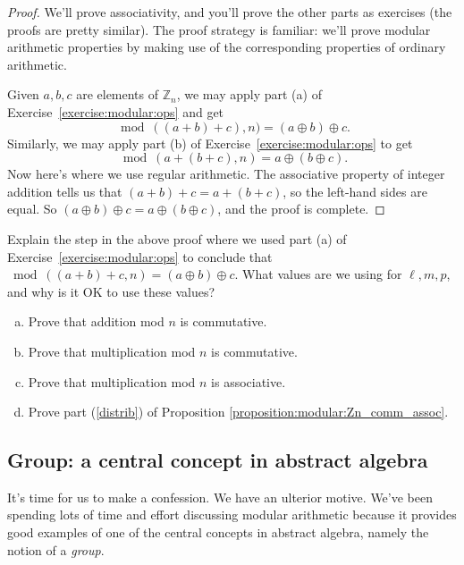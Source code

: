 \begin{proof}
We'll prove associativity, and  you'll prove the other parts as exercises (the proofs are pretty similar). The proof strategy is familiar: we'll prove modular arithmetic properties by making use of the corresponding properties of ordinary arithmetic.

Given $a,b,c$ are elements of $\mathbb{Z}_n$, 
we may apply part (a) of Exercise~\ref{exercise:modular:ops} and get
\[ \bmod((a + b) + c),n) =  (a \oplus b) \oplus c. \]
Similarly, we may apply part  (b) of Exercise~\ref{exercise:modular:ops} to get
\[ \bmod(a + (b + c),n) =  a \oplus (b \oplus c). \]
Now here's where we use regular arithmetic. The associative property of integer addition tells us that $(a+b)+c = a + (b + c) $, so the left-hand sides are equal. 
So $(a \oplus b) \oplus c = a \oplus (b \oplus c)$, and the proof is complete. 
\end{proof}
 
\begin{exercise}{}
Explain the step in the above proof where we used  part (a) of Exercise~\ref{exercise:modular:ops} to conclude that
$\bmod((a + b) + c,n) =  (a \oplus b) \oplus c$.  What values are we using for $\ell, m, p$, and why is it OK to use these values?
\end{exercise}

\begin{exercise}{}
\begin{enumerate}[(a)]
\item
Prove that addition mod $n$ is commutative.
\item
Prove that multiplication mod $n$ is commutative.
\item
Prove that multiplication mod $n$ is associative.
\item
Prove  part (\ref{distrib}) of Proposition \ref{proposition:modular:Zn_comm_assoc}.
\end{enumerate}
\end{exercise} 

\subsection{Group: a central concept in abstract algebra}\label{DefOfGroup}
It's time for us to make a confession. We have an ulterior motive. We've been spending lots of time and effort discussing modular arithmetic because it provides good examples of one of the central concepts in abstract algebra, namely the notion of a \emph{group}.

